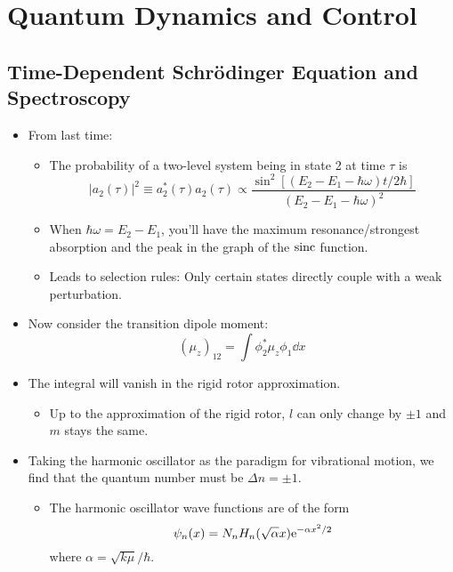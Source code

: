 \documentclass[../notes.tex]{subfiles}
\begin{document}
\chapter{Quantum Dynamics and Control}
\section{Time-Dependent Schr\"{o}dinger Equation and Spectroscopy}
\begin{itemize}
    \item {}From last time:
    \begin{itemize}
        \item The probability of a two-level system being in state 2 at time $\tau$ is
        \begin{equation*}
            |a_2(\tau)|^2 \equiv a_2^*(\tau)a_2(\tau) \propto \frac{\sin^2[(E_2-E_1-\hbar\omega)t/2\hbar]}{(E_2-E_1-\hbar\omega)^2}
        \end{equation*}
        \item When $\hbar\omega=E_2-E_1$, you'll have the maximum resonance/strongest absorption and the peak in the graph of the $\sinc$ function.
        \item Leads to selection rules: Only certain states directly couple with a weak perturbation.
    \end{itemize}
    \item Now consider the transition dipole moment:
    \begin{equation*}
        (\mu_z)_{12} = \int\phi_2^*\mu_z\phi_1\dd{x}
    \end{equation*}
    \item The integral will vanish in the rigid rotor approximation.
    \begin{itemize}
        \item Up to the approximation of the rigid rotor, $l$ can only change by $\pm 1$ and $m$ stays the same.
    \end{itemize}
    \item Taking the harmonic oscillator as the paradigm for vibrational motion, we find that the quantum number must be $\Delta n=\pm 1$.
    \begin{itemize}
        \item The harmonic oscillator wave functions are of the form
        \begin{equation*}
            \psi_n(x) = N_nH_n(\sqrt{\alpha}x)\e[-\alpha x^2/2]
        \end{equation*}
        where $\alpha=\sqrt{k\mu}/\hbar$.

\end{itemize}
\end{itemize}
\end{document}
